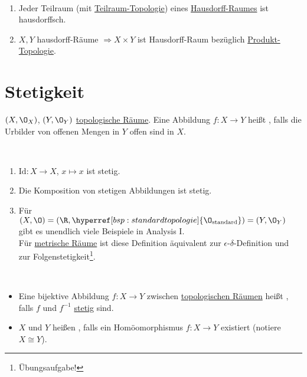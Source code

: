 \begin{remark}
  \
  \begin{enumerate}
    \item Jeder Teilraum (mit \hyperref[def:teilraumtopologie]{Teilraum-Topologie}) eines \hyperref[def:hausdorffsch]{Hausdorff-Raumes} ist hausdorffsch. 
    \item \( X, Y \) hausdorff-Räume \( \Rightarrow X \times Y \) ist Hausdorff-Raum bezüglich \hyperref[def:produkttopologie]{Produkt-Topologie}.
  \end{enumerate}
\end{remark}

\section{Stetigkeit}

\begin{definition}[Stetigkeit]\label{def:stetig}
  \( (X, \O_X) \), \( (Y, \O_Y) \) \hyperref[def:topologie]{topologische Räume}. Eine Abbildung \( f : X \to Y \) heißt , falls die Urbilder von offenen Mengen in \( Y \) offen sind in \( X \).
\end{definition}

\begin{example}
  \
  \begin{enumerate}
    \item \( \text{Id}: X \to X \), \( x \mapsto x \) ist stetig.
    \item Die Komposition von stetigen Abbildungen ist stetig.
    \item Für \( (X, \O) = (\R, \hyperref[bsp:standardtopologie]{\O_\text{standard}}) = (Y, \O_Y) \) gibt es unendlich viele Beispiele in Analysis I. \\
    Für \hyperref[def:metrischerRaum]{metrische Räume} ist diese Definition äquivalent zur \( \epsilon \)-\( \delta \)-Definition und zur Folgenstetigkeit\footnote{Übungsaufgabe!}.
  \end{enumerate}
\end{example}

\begin{definition}[Homöomorphismus]\label{def:homoeomorphismus} \
  \begin{itemize}
    \item Eine bijektive Abbildung \( f: X \to Y \) zwischen \hyperref[def:topologie]{topologischen Räumen} heißt , falls \( f \) und \( f^{-1} \) \hyperref[def:stetig]{stetig} sind.
    \item \( X \) und \( Y \) heißen \term{homöomorph}, falls ein Homöomorphismus \( f: X \to Y \) existiert (notiere \( X \cong Y \)). 
  \end{itemize}
\end{definition}


